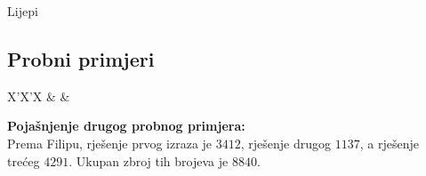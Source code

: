 \begin{statement}[
  problempoints=30,
  timelimit=1 sekunda,
  memorylimit=512 MiB,
]{Lijepi}
\subsection*{Probni primjeri}
\begin{tabularx}{\textwidth}{X'X'X}
 &
 &
\end{tabularx}

\textbf{Pojašnjenje drugog probnog primjera:} \\
Prema Filipu, rješenje prvog izraza je $3412$, rješenje drugog $1137$, a
rješenje trećeg $4291$. Ukupan zbroj tih brojeva je $8840$.

\end{statement}

